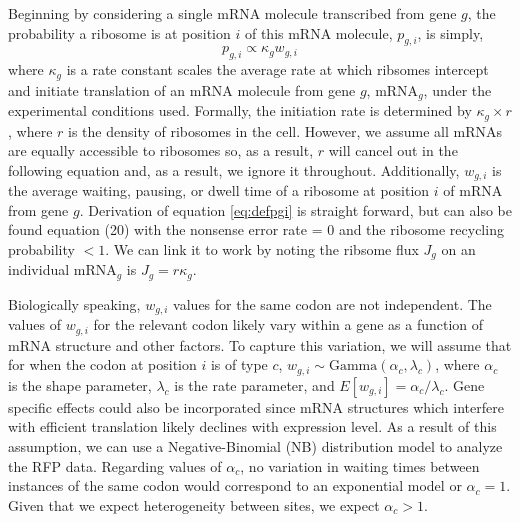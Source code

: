 \documentclass{article}
\newcommand{\elongWaitTime}{\ensuremath{w}\xspace}
\newcommand{\wgi}{\ensuremath{\elongWaitTime_{g,i}}\xspace}
\newcommand{\alphac}{\ensuremath{{\alpha_c}}\xspace}
\newcommand{\lambdac}{\ensuremath{{\lambda_c}}\xspace}
\newcommand{\pgi}{\ensuremath{{p_{g,i}}}\xspace}
\newcommand{\kappag}{\ensuremath{{\kappa_{g}}}\xspace}
\newcommand{\mRNAg}{mRNA$_g$\xspace}
\begin{document}
Beginning by considering a single mRNA molecule transcribed from gene $g$, the probability a ribosome is at position $i$ of this mRNA molecule, \pgi,  is simply,
\begin{equation} \label{eq:defpgi}
\pgi  \propto \kappag \wgi
\end{equation}
where \kappag is a rate constant scales the average rate at which ribsomes intercept and initiate translation of an mRNA molecule from gene $g$, \mRNAg, under the experimental conditions used.
Formally, the initiation rate is determined by $\kappag \times r$, where  $r$ is the density of ribosomes in the cell.
However, we assume all mRNAs are equally accessible to ribosomes so, as a result, $r$ will cancel out in the following equation and, as a result, we ignore it throughout.
Additionally, \wgi is the average waiting, pausing, or dwell time of a ribosome at position $i$ of mRNA from gene $g$.  
Derivation of equation \ref{eq:defpgi} is straight forward, but can also be found \citet{GilchristAndWagner2006} equation (20) with the nonsense error rate = 0 and the ribosome recycling probability $<1$.
We can link it to \citet{PopEtAl2014} work by noting the ribsome flux $J_g$ on an individual \mRNAg is $J_g = r \kappag$.

Biologically speaking, \wgi values for the same codon are not independent.
The values of \wgi for the relevant codon likely vary within a gene as a function of mRNA structure and other factors.
To capture this variation, we will assume that for when the codon at position $i$ is of type $c$, $\wgi \sim \text{Gamma}(\alphac, \lambdac)$, where \alphac is the shape parameter, \lambdac is the rate parameter, and $E[\wgi] = \alphac/\lambdac$. %
Gene specific effects could also be incorporated since  mRNA structures which interfere with efficient translation likely declines with expression level.
As a result of this assumption, we can use a Negative-Binomial (NB) distribution model to analyze the RFP data.
Regarding values of $\alphac$, no variation in waiting times between instances of the same codon would correspond to an exponential model or $\alphac = 1$.
Given that we expect heterogeneity between sites, we expect $\alphac > 1$.
\end{document}
